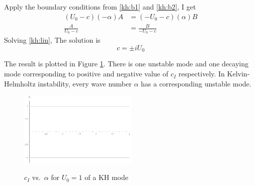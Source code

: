 Apply the boundary conditions from \eqref{kh:b1} and \eqref{kh:b2},
I get
\begin{subequations}\label{kh:lin}
\begin{align}
    (U_0-c)(-\alpha)A&=(-U_0-c)(\alpha)B\label{kh:lin1}\\
    \frac{A}{U_0-c}&=\frac{B}{-U_0-c}\label{kh:lin2}
\end{align}
\end{subequations}
Solving \eqref{kh:lin}, The solution is
\begin{equation}\label{lh:c}
    \boxed{c=\pm i U_0}
\end{equation}

The result is plotted in Figure \ref{kh1}. There is one unstable
mode and one decaying mode corresponding to positive and negative
value of $c_I$ respectively. In Kelvin-Helmholtz instability, every
wave number $\alpha$ has a corresponding unstable mode.
\begin{figure}[htpb]
  \centering
  \includegraphics[width=0.5\textwidth]{kh1.png}\\
  \caption{$c_I$ vs.~$\alpha$ for $U_0=1$ of a KH mode}\label{kh1}
\end{figure}
